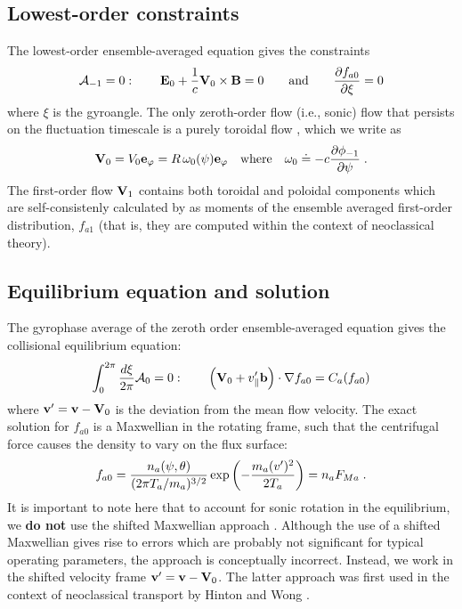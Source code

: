 \subsection{Lowest-order constraints}

The lowest-order ensemble-averaged equation gives the constraints 
%
\begin{equation}
{\cal A}_{-1} = 0: \qquad {\bf E}_0 + \frac{1}{c} {\bf V}_0 \times \mathbf{B} = 0 
\qquad\mbox{and}\qquad
\frac{\partial f_{a0}}{\partial \xi} = 0 
\end{equation}
%
where $\xi$ is the gyroangle.  The only zeroth-order flow 
(i.e., sonic) flow that persists on the fluctuation timescale 
is a purely toroidal flow \cite{hinton:1985}, which we write as
%
\begin{equation}
{\bf V}_0 = V_0 {\bf e}_\varphi = R \, \omega_0(\psi) {\bf e}_\varphi \quad\mbox{where}
\quad \omega_0 \doteq -c \frac{\partial\phi_{-1}}{\partial\psi} \; .
\end{equation}
%
The first-order flow ${\bf V}_1$ contains both toroidal and poloidal 
components which are self-consistenly calculated by as moments of 
the ensemble averaged first-order distribution, $f_{a1}$ (that is, 
they are computed within the context of neoclassical theory).

\subsection{Equilibrium equation and solution}

The gyrophase average of the zeroth order ensemble-averaged equation 
gives the collisional equilibrium equation:
%
\begin{equation}
\int_0^{2\pi} \frac{d\xi}{2\pi} {\cal A}_0 = 0 : \qquad 
\left( {\bf V}_0 + v_\parallel^\prime \mathbf{b} \right) \cdot\nabla f_{a0} = C_a(f_{a0})
\end{equation}
%
where ${\bf v}^\prime = {\bf v} - {\bf V}_0$ is the deviation from
the mean flow velocity.  The exact solution for $f_{a0}$ is a Maxwellian 
in the rotating frame, such that the centrifugal force causes the density 
to vary on the flux surface: 
%
\begin{equation}
f_{a0} = \frac{n_a(\psi,\theta)}{(2\pi T_a/m_a)^{3/2}} 
 \exp\left( -\frac{m_a (v^\prime)^2}{2 T_a} \right) 
= n_a F_{Ma} \; .
\end{equation} 
%
It is important to note here that to account for sonic rotation in the 
equilibrium, we {\bf do not} use the shifted Maxwellian approach 
\cite{waltz:2007b}.  Although the use of a shifted Maxwellian gives 
rise to errors which are probably not significant for typical operating 
parameters, the approach is conceptually incorrect.  Instead, we work 
in the shifted velocity frame ${\bf v}^\prime = {\bf v} - {\bf V}_0$.  
The latter approach was first used in the context of neoclassical 
transport by Hinton and Wong \cite{hinton:1985}. 


